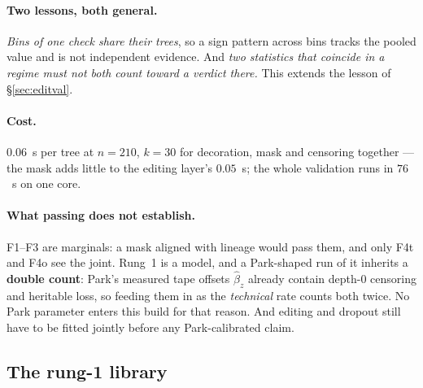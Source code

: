 \paragraph{Two lessons, both general.} \emph{Bins of one check share their trees}, so a sign pattern
across bins tracks the pooled value and is not independent evidence. And \emph{two statistics that
coincide in a regime must not both count toward a verdict there.} This extends the lesson of
\S\ref{sec:editval}.

\paragraph{Cost.} $0.06$~s per tree at $n=210$, $k=30$ for decoration, mask and censoring together ---
the mask adds little to the editing layer's $0.05$~s; the whole validation runs in $76$~s on one core.

\paragraph{What passing does not establish.} F1--F3 are marginals: a mask aligned with lineage would
pass them, and only F4t and F4o see the joint. Rung~1 is a model, and a Park-shaped run of it inherits
a \textbf{double count}: Park's measured tape offsets $\hat\beta_z$ already contain depth-0 censoring
and heritable loss, so feeding them in as the \emph{technical} rate counts both twice. No Park
parameter enters this build for that reason. And editing and dropout still have to be fitted jointly
before any Park-calibrated claim.

\subsection{The rung-1 library}\label{sec:drop1lib}

